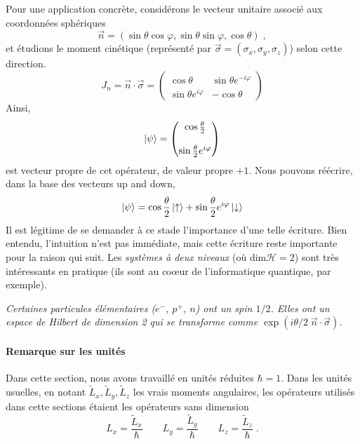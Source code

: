\documentclass[../notesdecours.tex]{subfiles}
\begin{document}
Pour une application concrète, considérons le vecteur unitaire associé aux coordonnées sphériques  $$\vec{n} = \left(\sin\theta\cos\varphi,\sin\theta\sin\varphi,\cos\theta\right) \; ,$$ et étudions le moment cinétique (représenté par $\vec \sigma = (\sigma_x, \sigma_y, \sigma_z)$) selon cette direction. 
\begin{equation}
    J_n = \vec{n}\cdot\vec{\sigma} = \begin{pmatrix}
        \cos\theta & \sin\theta e^{-i\varphi}\\
        \sin\theta e^{i\varphi} & -\cos\theta
    \end{pmatrix}
\end{equation}
Ainsi,
$$\ket \psi = \begin{pmatrix}
    \cos\frac{\theta}{2}\\
    \strut \\
    \sin\frac{\theta}{2}e^{i\varphi}
\end{pmatrix}$$ est vecteur propre de cet opérateur, de valeur propre $+1$. Nous pouvons réécrire, dans la base des vecteurs up and down,
\begin{equation}
    \ket \psi = \cos\frac{\theta}{2}\ket{\uparrow}+\sin\frac{\theta}{2}e^{i\varphi}\ket{\downarrow}
\end{equation}
Il est légitime de se demander à ce stade l'importance d'une telle écriture. Bien entendu, l'intuition n'est pas immédiate, mais cette écriture reste importante pour la raison qui suit. Les \textit{systèmes à deux niveaux} (où $\mathrm{dim} \mathcal{H}=2$) sont très intéressants en pratique (ils sont au coœur de l'informatique quantique, par exemple). {\color{red}{Insérer une interprétation de cette équation : la sphère de Bloch}} \\

\begin{leftbar}
    \textit{Certaines particules élémentaires ($e^-$, $p^+$, $n$) ont un spin $1/2$. Elles ont un espace de Hilbert de dimension 2 qui se transforme comme $\exp(i\theta/2 \; \vec n\cdot \vec \sigma)$.}
\end{leftbar}

\paragraph{Remarque sur les unités}
Dans cette section, nous avons travaillé en unités réduites $\hbar =  1$. Dans les unités usuelles, en notant $\tilde{L}_x, \tilde{L}_y, \tilde{L}_z$ les vrais moments angulaires, les opérateurs utilisés dans cette sections étaient les opérateurs sans dimension 
$$L_x = \dfrac{\tilde{L}_x}{\hbar} \qquad L_y = \dfrac{\tilde{L}_y}{\hbar} \qquad L_z = \dfrac{\tilde{L}_z}{\hbar}  \; .$$
\end{document}
